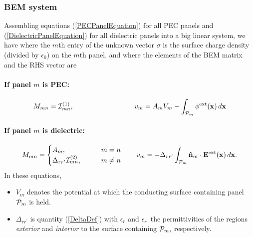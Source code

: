 \documentclass[letterpaper]{article}
\begin{document}
\subsubsection*{BEM system}

Assembling equations (\ref{PECPanelEquation}) for all PEC panels
and (\ref{DielectricPanelEquation}) for all dielectric panels 
into a big linear system, we have 
where the $m$th entry of the unknown vector $\sigma$ is the 
surface charge density (divided by $\epsilon_0$) on the $m$th
panel, and where the elements of the BEM matrix and the RHS vector are
\paragraph{If panel $m$ is PEC:}
$$
  M_{mn} = \mathcal{I}^{\hbox{\scriptsize{(1)}}}_{mn}, 
   \hspace{1.2in}
   v_m = A_{m} V_m - \int_{\mathcal{P}_m} \phi^{\hbox{\scriptsize{ext}}}(\mathbf{x}) \, d\mathbf{x}
$$
\paragraph{If panel $m$ is dielectric:}
$$ M_{mn} = 
   \begin{cases} 
     A_m, \qquad &m=n \\
     \Delta_{rr^\prime} \mathcal{I}^{\hbox{\scriptsize{(2)}}}_{mn}, \qquad &m\ne n
   \end{cases} 
   \qquad 
   v_m = -\Delta_{rr^\prime} \int_{\mathcal{P}_m} \mathbf{\hat n}_m \cdot \mathbf{E}^{\hbox{\scriptsize{ext}}}(\mathbf{x}) \, d\mathbf{x}.
$$
In these equations, 
\begin{itemize}
 \item $V_m$ denotes the potential at which the conducting surface
       containing panel $\mathcal{P}_m$ is held.
 \item $\Delta_{rr^\prime}$ is quantity (\ref{DeltaDef}) with $\epsilon_r$
       and $\epsilon_{r^\prime}$ the permittivities of the regions 
       \textit{exterior} and \textit{interior} to the surface containing
       $\mathcal{P}_m,$ respectively.
\end{itemize}

\end{document}
